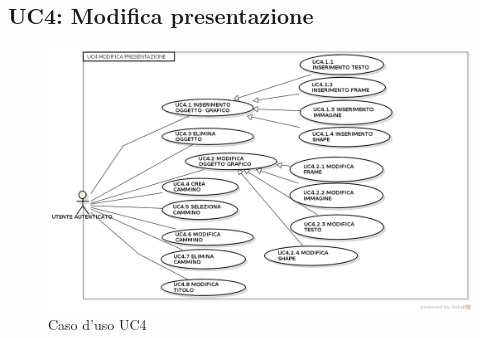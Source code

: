 \subsection{ UC4: Modifica presentazione}

\begin{figure}[H]
	\begin{center}
	\includegraphics[scale=0.4]{diagram/UC4.png}
	\caption{Caso d'uso UC4}
	\end{center}
\end{figure}
